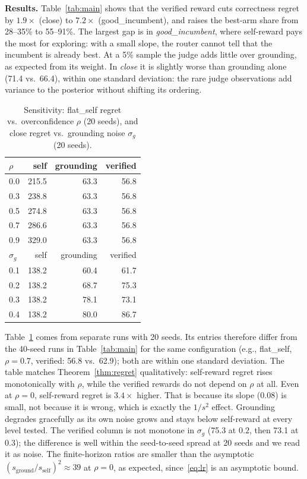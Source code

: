 \documentclass[conference]{IEEEtran}
\theoremstyle{definition}
\theoremstyle{remark}
\begin{document}
\textbf{Results.} Table~\ref{tab:main} shows that the verified reward cuts correctness regret by $1.9\times$ (close) to $7.2\times$ (good\_incumbent), and raises the best-arm share from 28--35\% to 55--91\%. The largest gap is in \emph{good\_incumbent}, where self-reward pays the most for exploring: with a small slope, the router cannot tell that the incumbent is already best. At a 5\% sample the judge adds little over grounding, as expected from its weight. In \emph{close} it is slightly worse than grounding alone (71.4 vs.\ 66.4), within one standard deviation: the rare judge observations add variance to the posterior without shifting its ordering.

\begin{table}[t]
\centering
\caption{Sensitivity: flat\_self regret vs.\ overconfidence $\rho$ (20 seeds), and close regret vs.\ grounding noise $\sigma_g$ (20 seeds).}
\label{tab:sweep}
\begin{tabular}{lrrr}
\toprule
$\rho$ & self & grounding & verified\\
\midrule
0.0 & 215.5 & 63.3 & 56.8\\
0.3 & 238.8 & 63.3 & 56.8\\
0.5 & 274.8 & 63.3 & 56.8\\
0.7 & 286.6 & 63.3 & 56.8\\
0.9 & 329.0 & 63.3 & 56.8\\
\midrule
$\sigma_g$ & self & grounding & verified\\
\midrule
0.1 & 138.2 & 60.4 & 61.7\\
0.2 & 138.2 & 68.7 & 75.3\\
0.3 & 138.2 & 78.1 & 73.1\\
0.4 & 138.2 & 80.0 & 86.7\\
\bottomrule
\end{tabular}
\end{table}

Table~\ref{tab:sweep} comes from separate runs with 20 seeds. Its entries therefore differ from the 40-seed runs in Table~\ref{tab:main} for the same configuration (e.g., flat\_self, $\rho=0.7$, verified: 56.8 vs.\ 62.9); both are within one standard deviation. The table matches Theorem~\ref{thm:regret} qualitatively: self-reward regret rises monotonically with $\rho$, while the verified rewards do not depend on $\rho$ at all. Even at $\rho=0$, self-reward regret is $3.4\times$ higher. That is because its slope ($0.08$) is small, not because it is wrong, which is exactly the $1/s^2$ effect. Grounding degrades gracefully as its own noise grows and stays below self-reward at every level tested. The verified column is not monotone in $\sigma_g$ (75.3 at $0.2$, then 73.1 at $0.3$); the difference is well within the seed-to-seed spread at 20 seeds and we read it as noise. The finite-horizon ratios are smaller than the asymptotic $(s_{\text{ground}}/s_{\text{self}})^2\approx39$ at $\rho=0$, as expected, since~\eqref{eq:lr} is an asymptotic bound.
\end{document}
